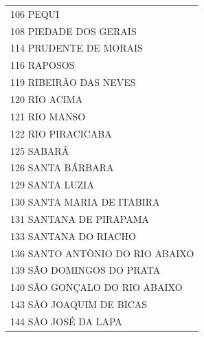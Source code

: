 \documentclass{article}
\begin{document}
\begin{longtable}[c]{m{18cm}}
\multicolumn{1}{l}{ \hspace{2em} 106 PEQUI } \\
\multicolumn{1}{l}{ \hspace{2em} 108 PIEDADE DOS GERAIS } \\
\multicolumn{1}{l}{ \hspace{2em} 114 PRUDENTE DE MORAIS } \\
\multicolumn{1}{l}{ \hspace{2em} 116 RAPOSOS } \\
\multicolumn{1}{l}{ \hspace{2em} 119 RIBEIRÃO DAS NEVES } \\
\multicolumn{1}{l}{ \hspace{2em} 120 RIO ACIMA } \\
\multicolumn{1}{l}{ \hspace{2em} 121 RIO MANSO } \\
\multicolumn{1}{l}{ \hspace{2em} 122 RIO PIRACICABA } \\
\multicolumn{1}{l}{ \hspace{2em} 125 SABARÁ } \\
\multicolumn{1}{l}{ \hspace{2em} 126 SANTA BÁRBARA } \\
\multicolumn{1}{l}{ \hspace{2em} 129 SANTA LUZIA } \\
\multicolumn{1}{l}{ \hspace{2em} 130 SANTA MARIA DE ITABIRA } \\
\multicolumn{1}{l}{ \hspace{2em} 131 SANTANA DE PIRAPAMA } \\
\multicolumn{1}{l}{ \hspace{2em} 133 SANTANA DO RIACHO } \\
\multicolumn{1}{l}{ \hspace{2em} 136 SANTO ANTÔNIO DO RIO ABAIXO } \\
\multicolumn{1}{l}{ \hspace{2em} 139 SÃO DOMINGOS DO PRATA } \\
\multicolumn{1}{l}{ \hspace{2em} 140 SÃO GONÇALO DO RIO ABAIXO } \\
\multicolumn{1}{l}{ \hspace{2em} 143 SÃO JOAQUIM DE BICAS } \\
\multicolumn{1}{l}{ \hspace{2em} 144 SÃO JOSÉ DA LAPA } \\

\end{longtable}
\end{document}
